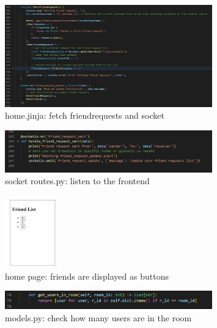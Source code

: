 \documentclass[12pt]{article}
\begin{document}
        \begin{figure}[H]
                \centering
                \includegraphics[width=0.8\textwidth]{zzrgraphs/home_fetchfriendrequests.png}
                \caption{home.jinja: fetch friendrequests and socket}
                \label{fetchrequests}
            \end{figure}
    
        \begin{figure}[H]
                \centering
                \includegraphics[width=0.8\textwidth]{zzrgraphs/socket_friend_request_sent.png}
                \caption{socket routes.py: listen to the frontend}
                \label{requestsocketio}
            \end{figure}

        \begin{figure}[H]
                \centering
                \includegraphics[width=0.2\textwidth]{zzrgraphs/friend_list.png}
                \caption{home page: friends are displayed as buttons}
                \label{friendlist}
            \end{figure}

        \begin{figure}[H]
            \centering
            \includegraphics[width=0.8\textwidth]{zzrgraphs/models_get_users_in_room.png}
            \caption{models.py: check how many users are in the room}
            \label{getusersinroom}
        \end{figure} 
\end{document}
